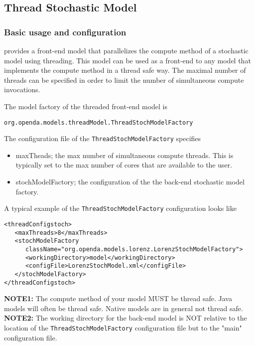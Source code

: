 \subsection{Thread Stochastic Model}
\subsubsection{Basic usage and configuration}
\oda provides a front-end model that parallelizes the compute method of a
stochastic model using threading. This model can be used as a front-end to any
\oda model that implements the compute method in a thread safe way. The maximal
number of threads can be specified in order to limit the number of simultaneous
compute invocations.

The model factory of the threaded front-end model is
\begin{verbatim}
org.openda.models.threadModel.ThreadStochModelFactory
\end{verbatim}

The configuration file of the {\tt ThreadStochModelFactory} specifies
\begin{itemize}
\item maxTheads; the max number of simultaneous compute threads. This is typically set to the
          max number of cores that are available to the user.
\item stochModelFactory; the configuration of the the back-end stochastic model factory.
\end{itemize}

A typical example of the {\tt ThreadStochModelFactory} configuration looks like
{\small
\begin{verbatim}
<threadConfigstoch>
   <maxThreads>8</maxThreads>
   <stochModelFactory
      className="org.openda.models.lorenz.LorenzStochModelFactory">
      <workingDirectory>model</workingDirectory>
      <configFile>LorenzStochModel.xml</configFile>
   </stochModelFactory>
</threadConfigstoch>
\end{verbatim}
}

{\bf NOTE1:} The compute method of your model MUST be thread safe. Java models
will often be thread safe. Native models are in general not thread safe.\\

{\bf NOTE2:} The working directory for the back-end model is NOT relative to
the location of the {\tt ThreadStochModelFactory} configuration file but to the
"main" \oda configuration file.

